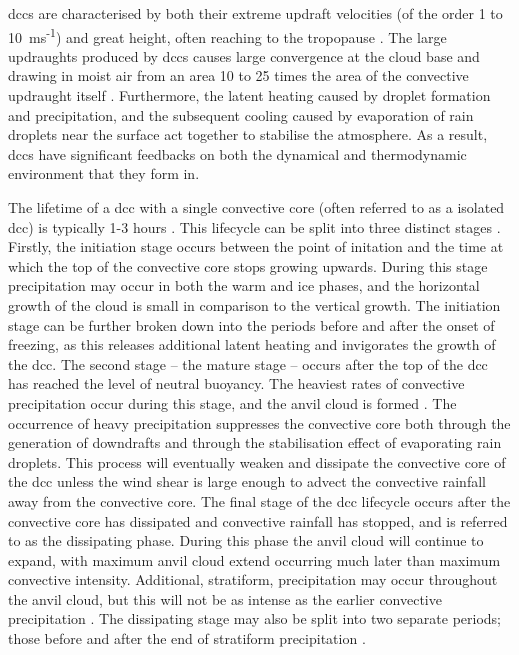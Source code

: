 \acrshort{dcc}s are characterised by both their extreme updraft velocities (of the order 1 to 10~ms\textsuperscript{-1}) and great height, often reaching to the tropopause \citep{weisman_mesoscale_2015}.
The large updraughts produced by \acrshort{dcc}s causes large convergence at the cloud base and drawing in moist air from an area 10 to 25 times the area of the convective updraught itself \citep{trenberth_changing_2003}.
Furthermore, the latent heating caused by droplet formation and precipitation, and the subsequent cooling caused by evaporation of rain droplets near the surface act together to stabilise the atmosphere.
As a result, \acrshort{dcc}s have significant feedbacks on both the dynamical and thermodynamic environment that they form in.

The lifetime of a \acrshort{dcc} with a single convective core (often referred to as a isolated \acrshort{dcc}) is typically 1-3 hours \citep{chen_diurnal_1997}.
This lifecycle can be split into three distinct stages \citep{wall_life_2018}.
Firstly, the initiation stage occurs between the point of initation and the time at which the top of the convective core stops growing upwards.
During this stage precipitation may occur in both the warm and ice phases, and the horizontal growth of the cloud is small in comparison to the vertical growth.
The initiation stage can be further broken down into the periods before and after the onset of freezing, as this releases additional latent heating and invigorates the growth of the \acrshort{dcc}.
The second stage -- the mature stage -- occurs after the top of the \acrshort{dcc} has reached the level of neutral buoyancy.
The heaviest rates of convective precipitation occur during this stage, and the anvil cloud is formed \citep{houze_chapter_2014}.
The occurrence of heavy precipitation suppresses the convective core both through the generation of downdrafts and through the stabilisation effect of evaporating rain droplets.
This process will eventually weaken and dissipate the convective core of the \acrshort{dcc} unless the wind shear is large enough to advect the convective rainfall away from the convective core.
The final stage of the \acrshort{dcc} lifecycle occurs after the convective core has dissipated and convective rainfall has stopped, and is referred to as the dissipating phase.
During this phase the anvil cloud will continue to expand, with maximum anvil cloud extend occurring much later than maximum convective intensity.
Additional, stratiform, precipitation may occur throughout the anvil cloud, but this will not be as intense as the earlier convective precipitation \citep{houze_chapter_2014}.
The dissipating stage may also be split into two separate periods; those before and after the end of stratiform precipitation \citep{wall_life_2018}.

